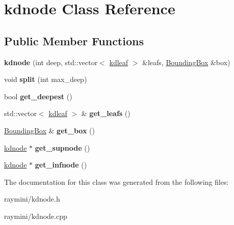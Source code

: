 \hypertarget{classkdnode}{
\section{kdnode Class Reference}
\label{classkdnode}
}
\subsection*{Public Member Functions}
\begin{DoxyCompactItemize}
\item 
\hypertarget{classkdnode_a2532657ec48279c0a88612802725f537}{
{\bfseries kdnode} (int deep, std::vector$<$ \hyperlink{classkdleaf}{kdleaf} $>$ \&leafs, \hyperlink{class_bounding_box}{BoundingBox} \&box)}
\label{classkdnode_a2532657ec48279c0a88612802725f537}

\item 
\hypertarget{classkdnode_a49bdc6fb34ef685e555404a19805946f}{
void {\bfseries split} (int max\_\-deep)}
\label{classkdnode_a49bdc6fb34ef685e555404a19805946f}

\item 
\hypertarget{classkdnode_ad7ef1f57c055c196fcb29b0fd005b4dc}{
bool {\bfseries get\_\-deepest} ()}
\label{classkdnode_ad7ef1f57c055c196fcb29b0fd005b4dc}

\item 
\hypertarget{classkdnode_a8cabbc55f36a391030e9ea4260d8a261}{
std::vector$<$ \hyperlink{classkdleaf}{kdleaf} $>$ \& {\bfseries get\_\-leafs} ()}
\label{classkdnode_a8cabbc55f36a391030e9ea4260d8a261}

\item 
\hypertarget{classkdnode_a102eca21308077d05d24ffa2d6d89106}{
\hyperlink{class_bounding_box}{BoundingBox} \& {\bfseries get\_\-box} ()}
\label{classkdnode_a102eca21308077d05d24ffa2d6d89106}

\item 
\hypertarget{classkdnode_aa853003afe7a7883b6243f27b02102dc}{
\hyperlink{classkdnode}{kdnode} $\ast$ {\bfseries get\_\-supnode} ()}
\label{classkdnode_aa853003afe7a7883b6243f27b02102dc}

\item 
\hypertarget{classkdnode_a5e58bb6724b2bab5c092c04b58276daa}{
\hyperlink{classkdnode}{kdnode} $\ast$ {\bfseries get\_\-infnode} ()}
\label{classkdnode_a5e58bb6724b2bab5c092c04b58276daa}

\end{DoxyCompactItemize}


The documentation for this class was generated from the following files:\begin{DoxyCompactItemize}
\item 
raymini/kdnode.h\item 
raymini/kdnode.cpp\end{DoxyCompactItemize}
